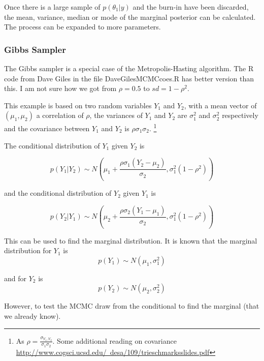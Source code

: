 \documentclass[12pt, a4paper, oneside]{article} %
\begin{document}
Once there is a large sample of $p(\theta_1|y)$ and the burn-in have been discarded, the mean, variance, median or mode of the marginal posterior can be calculated.  The process can be expanded to more parameters. 

\subsubsection{Gibbs Sampler}
The Gibbs sampler is a special case of the Metropolis-Hasting algorithm. 
The R code from Dave Giles in the file DaveGilesMCMCcoes.R has better version than this. I am not sure how we got from $\rho = 0.5$ to $sd = 1-\rho^2$. 

This example is based on two random variables $Y_1$ and $Y_2$, with a mean vector of $(\mu_1, \mu_2)$ a correlation of $\rho$, the variances of $Y_1$ and $Y_2$ are $\sigma_1^2$ and $\sigma_2^2$ respectively and the covariance between $Y_1$ and $Y_2$ is $\rho \sigma_1 \sigma_2$. \footnote{As $\rho = \frac{\sigma_{Y_1, Y_2}}{\sigma_1 \sigma_2}$.  Some additional reading on covariance \href{http://www.cogsci.ucsd.edu/~desa/109/trieschmarksslides.pdf}{http://www.cogsci.ucsd.edu/~desa/109/trieschmarksslides.pdf}}



The conditional distribution of $Y_1$ given $Y_2$ is 

\begin{equation}
p(Y_1| Y_2) \sim N \left(\mu_1 + \frac{\rho\sigma_1(Y_2 - \mu_2)}{\sigma_2}, \sigma_1^2(1 - \rho^2)\right)
\end{equation}

and the conditional distribution of $Y_2$ given $Y_1$ is

\begin{equation}
p(Y_2| Y_1) \sim N \left(\mu_2 + \frac{\rho\sigma_2(Y_1 - \mu_1)}{\sigma_2}, \sigma_1^2(1 - \rho^2) \right)
\end{equation}

This can be used to find the marginal distribution. It is known that the marginal distribution for $Y_1$ is
\begin{equation}
p(Y_1) \sim N(\mu_1, \sigma_1^2)
\end{equation}

and for $Y_2$ is 
\begin{equation}
p(Y_2) \sim N(\mu_2, \sigma_2^2)
\end{equation}

However, to test the MCMC draw from the conditional to find the marginal (that we already know).  
\end{document}
